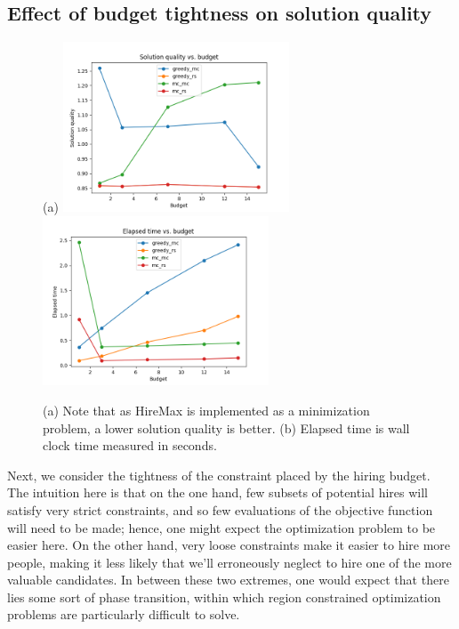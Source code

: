 \subsection{Effect of budget tightness on solution quality}

\begin{figure}[h!]
	\centering
	(a) 	\includegraphics[width=0.6\textwidth]{figs/budget_results_multi_ground_set_plot.png}
	\includegraphics[width=0.6\textwidth]{figs/budget_results_multi_ground_set_time_plot.png}
	\caption{(a) Note that as HireMax is implemented as a minimization problem, a lower solution quality is better. (b) Elapsed time is wall clock time measured in seconds.}
	\label{fig:budget}
\end{figure}

Next, we consider the tightness of the constraint placed by the hiring budget.
The intuition here is that on the one hand, few subsets of potential hires will satisfy very strict constraints, and so few evaluations of the objective function will need to be made; hence, one might expect the optimization problem to be easier here.
On the other hand, very loose constraints make it easier to hire more people, making it less likely that we'll erroneously neglect to hire one of the more valuable candidates.
In between these two extremes, one would expect that there lies some sort of phase transition, within which region constrained optimization problems are particularly difficult to solve.

